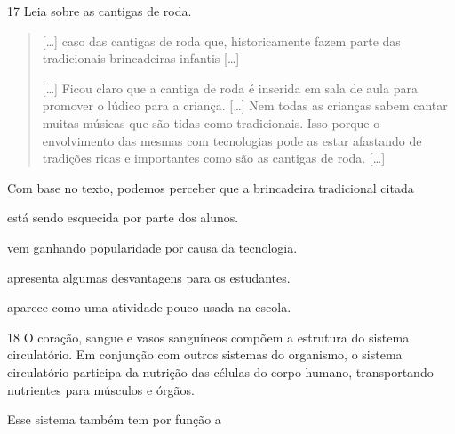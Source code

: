 \num{17} Leia sobre as cantigas de roda.
\begin{quote}
  {[}\ldots{}{]} caso das cantigas de roda que, historicamente fazem parte
  das tradicionais brincadeiras infantis {[}\ldots{}{]}

{[}\ldots{}{]} Ficou claro que a cantiga de roda é inserida em sala de aula
para promover o lúdico para a criança. {[}\ldots{}{]} Nem todas as crianças
sabem cantar muitas músicas que são tidas como tradicionais. Isso porque
o envolvimento das mesmas com tecnologias pode as estar afastando de
tradições ricas e importantes como são as cantigas de roda. {[}\ldots{}{]}

\end{quote}

\noindent{}Com base no texto, podemos perceber que a brincadeira tradicional citada

\begin{escolha}
\item está sendo esquecida por parte dos alunos.

\item vem ganhando popularidade por causa da tecnologia.

\item apresenta algumas desvantagens para os estudantes.

\item aparece como uma atividade pouco usada na escola.
\end{escolha}



\num{18} O coração, sangue e vasos sanguíneos compõem a estrutura do
sistema circulatório. Em conjunção com outros sistemas do organismo, o
sistema circulatório participa da nutrição das células do corpo humano,
transportando nutrientes para músculos e órgãos.

Esse sistema também tem por função a

